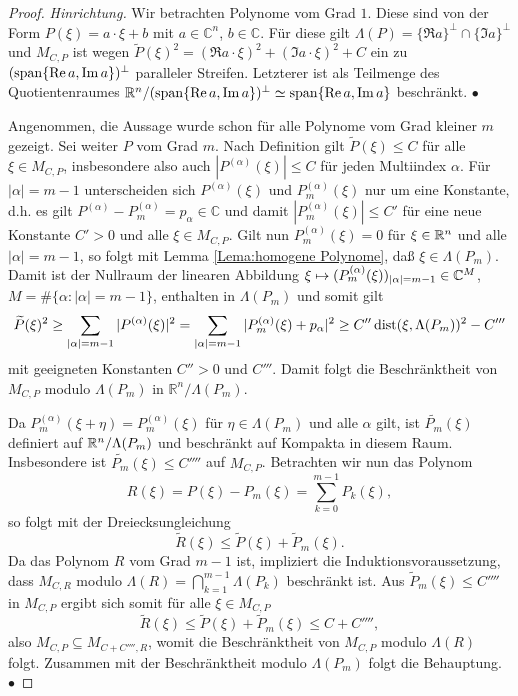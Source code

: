 \begin{proof}{\em Hinrichtung.}
 Wir betrachten Polynome vom Grad $1$. Diese sind von der Form 
$P(\xi) =  a \cdot \xi + b$ mit $ a  \in \mathbb{C}^n$, $b \in \mathbb{C}$. Für diese gilt $\Lambda(P)=\{\Re a\}^{\perp}\cap\{\Im a\}^\perp$ und $M_{C,P}$ ist wegen $\widetilde P(\xi)^2 = (\Re a\cdot \xi)^2+(\Im a\cdot \xi)^2 + C$ ein zu 
$(\operatorname{span}\{\operatorname{Re} a,\operatorname{Im} a\})^\perp$ paralleler Streifen. Letzterer ist als Teilmenge des Quotientenraumes $\mathbb{R}^n/(\operatorname{span}\{\operatorname{Re} a,\operatorname{Im} a\})^{\perp}\simeq \operatorname{span}\{\operatorname{Re} a,\operatorname{Im} a\}$ beschränkt. $\bullet$

 Angenommen, die Aussage wurde schon für alle Polynome vom Grad kleiner $m$ gezeigt. Sei weiter $P$ vom Grad $m$.
Nach Definition gilt $\widetilde{P}(\xi) \leq C$ für alle $\xi \in M_{C,P}$, insbesondere also auch $|P^{(\alpha)}(\xi)|\leq C$ für jeden Multiindex $\alpha$. Für $|\alpha|=m-1$ unterscheiden sich $P^{(\alpha)}(\xi)$ und $P_m^{(\alpha)}(\xi)$ nur um eine Konstante, d.h. es gilt $P^{(\alpha)}-P_m^{(\alpha)}=p_\alpha \in\mathbb{C}$ und damit $|P_m^{(\alpha)}(\xi)| \leq C'$ für eine neue Konstante $C'>0$ und alle $\xi \in M_{C,P}$. Gilt nun  $P_m^{(\alpha)}(\xi)=0$ für $\xi\in\mathbb R^n$ und alle $|\alpha|=m-1$, 
so folgt mit Lemma \ref{Lema:homogene Polynome}, daß $\xi \in \Lambda(P_m)$. 
Damit ist der Nullraum der linearen Abbildung $\xi \mapsto ( P^{(\alpha)}_m(\xi))_{|\alpha|=m-1} \in\mathbb C^M$, $M=\#\{\alpha : |\alpha|=m-1\}$, enthalten in $\Lambda(P_m)$
und somit gilt
\begin{equation}
    \widetilde {P}(\xi)^2 \ge \sum_{|\alpha|=m-1} |P^{(\alpha)}(\xi)|^2 =\sum_{|\alpha|=m-1} |P^{(\alpha)}_m(\xi)+p_\alpha |^2  \ge C'' \operatorname{dist}( \xi,\Lambda(P_m) )^2 - C'''
\end{equation}
mit geeigneten Konstanten $C''>0$ und $C'''$. Damit folgt die Beschränktheit von $M_{C,P}$ modulo $\Lambda(P_m)$ in $\mathbb{R}^n/\Lambda(P_m)$. 

Da $P_m^{(\alpha)}(\xi+\eta) = P_m^{(\alpha)}(\xi)$ für $\eta\in\Lambda(P_m)$ und alle $\alpha$ gilt, ist $\widetilde{P_m}(\xi)$ definiert auf $\mathbb R^n/\Lambda(P_m)$ und beschränkt auf Kompakta in diesem Raum. Insbesondere ist $\widetilde {P_m}(\xi)\le C''''$ auf $M_{C,P}$. 
Betrachten wir nun das Polynom
\begin{equation}
R(\xi)=P(\xi) - P_m(\xi) = \sum_{k=0}^{m-1} P_k(\xi),
\end{equation}
so folgt mit der Dreiecksungleichung
\begin{equation}
\widetilde{R}(\xi) \leq \widetilde{P}(\xi) + \widetilde{P}_m(\xi).
\end{equation}
Da das Polynom $R$ vom Grad $m-1$ ist, impliziert die Induktionsvoraussetzung, dass $M_{C,R}$ modulo $\Lambda(R)=\bigcap_{k=1}^{m-1} \Lambda (P_k)$ beschränkt ist. Aus $\widetilde{P}_m(\xi) \leq C''''$ in $M_{C,P}$ ergibt sich somit für alle $\xi\in M_{C,P}$
\begin{equation}
\widetilde{R}(\xi) \leq \widetilde{P}(\xi) + \widetilde{P}_m(\xi) \leq C + C'''',
\end{equation}
also $M_{C,P} \subseteq M_{C+C'''',R}$, womit die Beschränktheit von $M_{C,P}$ modulo $\Lambda(R)$ folgt. Zusammen mit der Beschränktheit modulo $\Lambda(P_m)$ folgt die Behauptung. $\bullet$


\end{proof}
